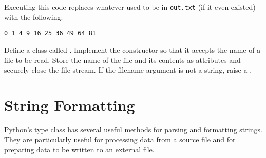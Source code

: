 Executing this code replaces whatever used to be in \texttt{out.txt} (if it even existed) with the following:

\begin{lstlisting}
0 1 4 9 16 25 36 49 64 81
\end{lstlisting}

\begin{problem} %
Define a class called .
Implement the constructor so that it accepts the name of a file to be read.
Store the name of the file and its contents as attributes and securely close the file stream.
If the filename argument is not a string, raise a .
\end{problem}

\section*{String Formatting} %

Python's  type class has several useful methods for parsing and formatting strings.
They are particularly useful for processing data from a source file and for preparing data to be written to an external file.

